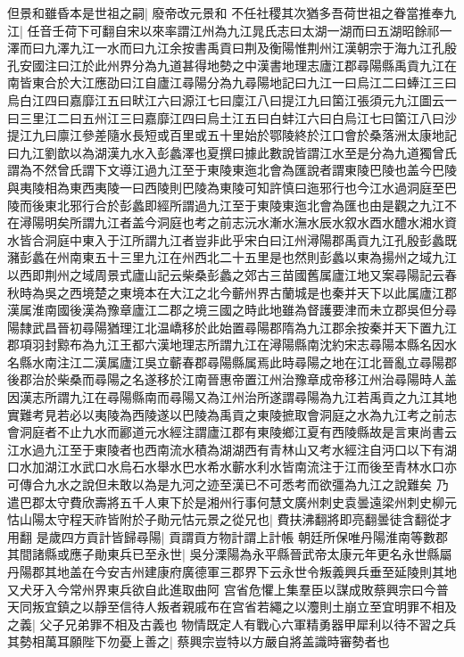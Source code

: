 但景和雖昏本是世祖之嗣|{
	廢帝改元景和}
不任社稷其次猶多吾荷世祖之眷當推奉九江|{
	任音壬荷下可翻自宋以來率謂江州為九江晁氏志曰太湖一湖而曰五湖昭餘祁一澤而曰九澤九江一水而曰九江余按書禹貢曰荆及衡陽惟荆州江漢朝宗于海九江孔殷孔安國注曰江於此州界分為九道甚得地勢之中漢書地理志廬江郡尋陽縣禹貢九江在南皆東合於大江應劭曰江自廬江尋陽分為九尋陽地記曰九江一曰烏江二曰蜯江三曰烏白江四曰嘉靡江五曰畎江六曰源江七曰廩江八曰提江九曰箘江張須元九江圖云一曰三里江二曰五州江三曰嘉靡江四曰烏土江五曰白蚌江六曰白烏江七曰箘江八曰沙提江九曰廪江參差隨水長短或百里或五十里始於鄂陵終於江口會於桑落洲太康地記曰九江劉歆以為湖漢九水入彭蠡澤也夏撰曰據此數說皆謂江水至是分為九道獨曾氏謂為不然曾氏謂下文導江過九江至于東陵東迤北會為匯說者謂東陵巴陵也盖今巴陵與夷陵相為東西夷陵一曰西陵則巴陵為東陵可知許慎曰迤邪行也今江水過洞庭至巴陵而後東北邪行合於彭蠡即經所謂過九江至于東陵東迤北會為匯也由是觀之九江不在潯陽明矣所謂九江者盖今洞庭也考之前志沅水漸水潕水辰水叙水酉水醴水湘水資水皆合洞庭中東入于江所謂九江者豈非此乎宋白曰江州潯陽郡禹貢九江孔殷彭蠡既瀦彭蠡在州南東五十三里九江在州西北二十五里是也然則彭蠡以東為揚州之域九江以西即荆州之域周景式廬山記云柴桑彭蠡之郊古三苗國舊属廬江地又案尋陽記云春秋時為吳之西境楚之東境本在大江之北今蘄州界古蘭城是也秦并天下以此属廬江郡漢属淮南國後漢為豫章廬江二郡之境三國之時此地雖為督護要津而未立郡吳但分尋陽隸武昌晉初尋陽猶理江北温嶠移於此始置尋陽郡隋為九江郡余按秦并天下置九江郡項羽封黥布為九江王都六漢地理志所謂九江在潯陽縣南沈約宋志尋陽本縣名因水名縣水南注江二漢属廬江吳立蘄春郡尋陽縣属焉此時尋陽之地在江北晉亂立尋陽郡後郡治於柴桑而尋陽之名遂移於江南晉惠帝置江州治豫章成帝移江州治尋陽時人盖因漢志所謂九江在尋陽縣南而尋陽又為江州治所遂謂尋陽為九江若禹貢之九江其地實難考見若必以夷陵為西陵遂以巴陵為禹貢之東陵摭取會洞庭之水為九江考之前志會洞庭者不止九水而酈道元水經注謂廬江郡有東陵鄉江夏有西陵縣故是言東尚書云江水過九江至于東陵者也西南流水積為湖湖西有青林山又考水經注自沔口以下有湖口水加湖江水武口水烏石水舉水巴水希水蘄水利水皆南流注于江而後至青林水口亦可傳合九水之說但未敢以為是九河之迹至漢已不可悉考而欲彊為九江之說難矣}
乃遣巴郡太守費欣壽將五千人東下於是湘州行事何慧文廣州刺史袁曇遠梁州刺史柳元怙山陽太守程天祚皆附於子勛元怙元景之從兄也|{
	費扶沸翻將即亮翻曇徒含翻從才用翻}
是歲四方貢計皆歸尋陽|{
	貢謂貢方物計謂上計帳}
朝廷所保唯丹陽淮南等數郡其間諸縣或應子勛東兵已至永世|{
	吳分溧陽為永平縣晉武帝太康元年更名永世縣屬丹陽郡其地盖在今安吉州建康府廣德軍三郡界下云永世令叛義興兵垂至延陵則其地又犬牙入今常州界東兵欲自此進取曲阿}
宫省危懼上集羣臣以謀成敗蔡興宗曰今普天同叛宜鎮之以靜至信待人叛者親戚布在宫省若繩之以灋則土崩立至宜明罪不相及之義|{
	父子兄弟罪不相及古義也}
物情既定人有戰心六軍精勇器甲犀利以待不習之兵其勢相萬耳願陛下勿憂上善之|{
	蔡興宗豈特以方嚴自將盖識時審勢者也}
